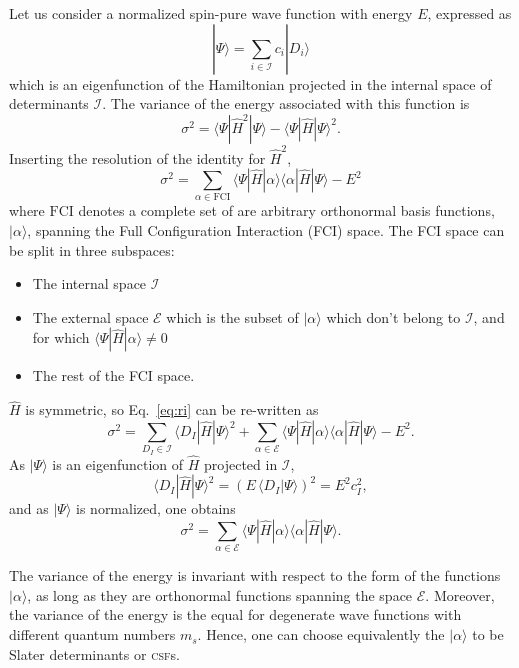 \documentclass[aip,jcp,reprint,showkeys]{revtex4-1}
\newcommand{\ket}[1]{|#1\rangle}
\newcommand{\csf}{\textsc{csf}}
\newcommand{\mel}[3]{\langle #1 | #2 | #3 \rangle}
\begin{document}
Let us consider a normalized spin-pure wave function with energy $E$, expressed as
\begin{equation}
\ket{\Psi} = \sum_{i \in \mathcal{I}} c_i \ket{D_i}
\end{equation}
which is an eigenfunction of the Hamiltonian projected in the internal space of
determinants $\mathcal{I}$.
The variance of the energy associated with this function is
\begin{equation}
\sigma^2 = \mel{\Psi}{\hat{H}^2}{\Psi} - \mel{\Psi}{\hat{H}}{\Psi}^2 .
\end{equation}
Inserting the resolution of the identity for $\hat{H}^2$, 
\begin{equation}
\sigma^2 = \sum_{\alpha \in \text{FCI}} \mel{\Psi}{\hat{H}}{\alpha} \mel{\alpha}{\hat{H}}{\Psi} - E^2
\label{eq:ri}
\end{equation}
where $\text{FCI}$ denotes a complete set of are arbitrary orthonormal basis
functions, $\ket{\alpha}$, spanning the Full Configuration Interaction (FCI)
space.
The FCI space can be split in three subspaces:
\begin{itemize}
\item The internal space $\mathcal{I}$
\item The external space $\mathcal{E}$ which is the subset of $\ket{\alpha}$ which
      don't belong to $\mathcal{I}$, and for which $\mel{\Psi}{\hat{H}}{\alpha}
      \ne 0$
\item The rest of the FCI space.
\end{itemize}
$\hat{H}$ is symmetric, so Eq.~\eqref{eq:ri} can be re-written as
\begin{equation}
\sigma^2 = \sum_{D_I    \in \mathcal{I}} \mel{D_I}{\hat{H}}{\Psi}^2 
         + \sum_{\alpha \in \mathcal{E}} \mel{\Psi}{\hat{H}}{\alpha} \mel{\alpha}{\hat{H}}{\Psi} - E^2.
\end{equation}
As $\ket{\Psi}$ is an eigenfunction of $\hat{H}$ projected in $\mathcal{I}$, 
\begin{equation}
\mel{D_I}{\hat{H}}{\Psi}^2 = \left( E\, \langle D_I | \Psi \rangle \right)^2 = E^2 c_I^2,
\end{equation}
and as $\ket{\Psi}$ is normalized, one obtains
\begin{equation}
\sigma^2 = \sum_{\alpha \in \mathcal{E}} \mel{\Psi}{\hat{H}}{\alpha}\mel{\alpha}{\hat{H}}{\Psi}.
\end{equation} 

The variance of the energy is invariant with respect to the form of the
functions $\ket{\alpha}$, as long as they are orthonormal functions spanning
the space $\mathcal{E}$.  Moreover, the variance of the energy is the equal for
degenerate wave functions with different quantum numbers $m_s$.  Hence, one can
choose equivalently the $\ket{\alpha}$ to be Slater determinants or
\csf s.
\end{document}
